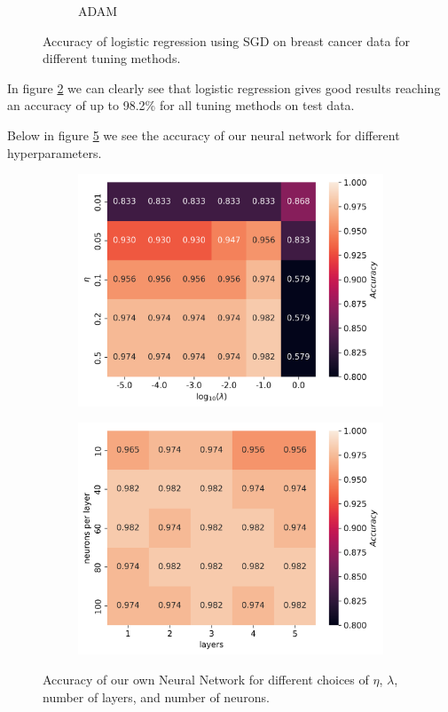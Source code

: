 \documentclass[11pt]{article}
\begin{document}
\begin{figure}[H]
\begin{subfigure}{.95\textwidth}
    \caption{ADAM}
    \label{fig:}
  \end{subfigure}
  \caption{Accuracy of logistic regression using SGD on breast cancer data for different tuning methods.}
  \label{fig:logreg_comp}
\end{figure}
In figure \ref{fig:logreg_comp} we can clearly see that logistic regression gives good results reaching an accuracy of up to 98.2\% for all tuning methods on test data.

Below in figure \ref{fig:NN_cancer} we see the accuracy of our neural network for different hyperparameters.
\begin{figure}[H]
  \begin{subfigure}{.5\textwidth}
    \centering
    \includegraphics[width=\textwidth]{../figures/cancer_eta_lmb.png}
    \caption{}
    \label{fig:}
  \end{subfigure}
  \begin{subfigure}{.5\textwidth}
    \centering
    \includegraphics[width=\textwidth]{../figures/cancer_L_n_test.png}
    \caption{}
    \label{fig:}
  \end{subfigure}
  \caption{Accuracy of our own Neural Network for different choices of $\eta$, $\lambda$, number of layers, and number of neurons.}
  \label{fig:NN_cancer}
\end{figure}
\end{document}
